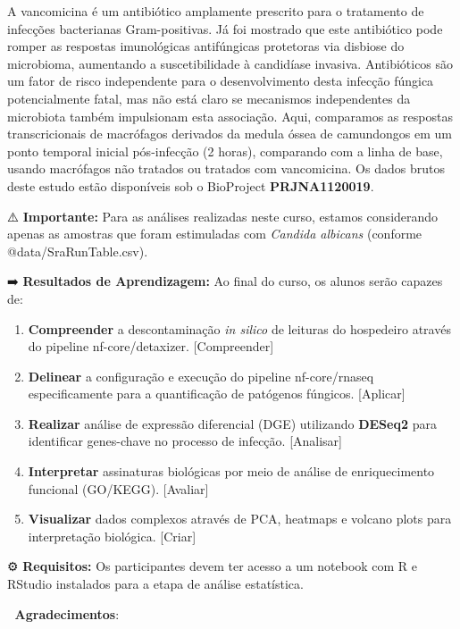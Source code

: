 \documentclass[
  letterpaper,
  DIV=11,
  numbers=noendperiod]{scrreprt}
\providecommand{\tightlist}{%
  \setlength{\itemsep}{0pt}\setlength{\parskip}{0pt}}
\begin{document}
A vancomicina é um antibiótico amplamente prescrito para o tratamento de
infecções bacterianas Gram-positivas. Já foi mostrado que este
antibiótico pode romper as respostas imunológicas antifúngicas
protetoras via disbiose do microbioma, aumentando a suscetibilidade à
candidíase invasiva. Antibióticos são um fator de risco independente
para o desenvolvimento desta infecção fúngica potencialmente fatal, mas
não está claro se mecanismos independentes da microbiota também
impulsionam esta associação. Aqui, comparamos as respostas
transcricionais de macrófagos derivados da medula óssea de camundongos
em um ponto temporal inicial pós-infecção (2 horas), comparando com a
linha de base, usando macrófagos não tratados ou tratados com
vancomicina. Os dados brutos deste estudo estão disponíveis sob o
BioProject \textbf{PRJNA1120019}.

⚠️ \textbf{Importante:} Para as análises realizadas neste curso, estamos
considerando apenas as amostras que foram estimuladas com \emph{Candida
albicans} (conforme @data/SraRunTable.csv).

➡️ \textbf{Resultados de Aprendizagem:} Ao final do curso, os alunos
serão capazes de:

\begin{enumerate}
\def\labelenumi{\arabic{enumi}.}
\tightlist
\item
  \textbf{Compreender} a descontaminação \emph{in silico} de leituras do
  hospedeiro através do pipeline nf-core/detaxizer. {[}Compreender{]}
\item
  \textbf{Delinear} a configuração e execução do pipeline nf-core/rnaseq
  especificamente para a quantificação de patógenos fúngicos.
  {[}Aplicar{]}
\item
  \textbf{Realizar} análise de expressão diferencial (DGE) utilizando
  \textbf{DESeq2} para identificar genes-chave no processo de infecção.
  {[}Analisar{]}
\item
  \textbf{Interpretar} assinaturas biológicas por meio de análise de
  enriquecimento funcional (GO/KEGG). {[}Avaliar{]}
\item
  \textbf{Visualizar} dados complexos através de PCA, heatmaps e volcano
  plots para interpretação biológica. {[}Criar{]}
\end{enumerate}

⚙️ \textbf{Requisitos:} Os participantes devem ter acesso a um notebook
com R e RStudio instalados para a etapa de análise estatística.

🙏 \textbf{Agradecimentos}:
\end{document}
